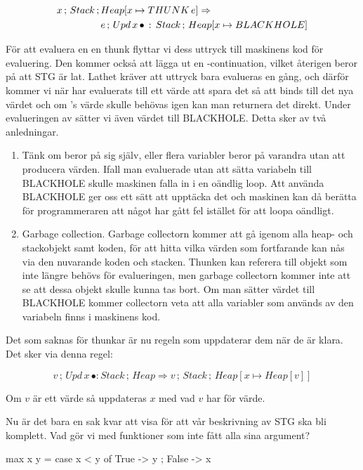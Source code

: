 \documentclass[../Core]{subfiles}
\begin{document}
\begin{align*}
x\,;\, Stack\,;\, & Heap[x\mapsto THUNK\,e] \Rightarrow  \\
 & e\,;\, Upd\, x\,\bullet\,:\, Stack\,;\, Heap[x\mapsto BLACKHOLE]
\end{align*}

För att evaluera en en thunk flyttar vi dess uttryck till maskinens kod
för evaluering. Den kommer också att lägga ut en -continuation, vilket
återigen beror på att STG är lat. Lathet kräver att uttryck bara evalueras
en gång, och därför kommer vi när  har evaluerats till ett värde att spara
det så att  binds till det nya värdet och om 's värde skulle behövas
igen kan man returnera det direkt. Under evalueringen av  sätter
vi även värdet  till BLACKHOLE. Detta sker av två anledningar.
\begin{enumerate}
\item Tänk om  beror på sig själv, eller flera variabler beror på varandra utan
att producera värden. Ifall man evaluerade utan att sätta variabeln till BLACKHOLE
skulle maskinen falla in i en oändlig loop. Att använda BLACKHOLE ger oss ett sätt att
upptäcka det och maskinen kan då berätta för programmeraren att något har gått fel
istället för att loopa oändligt.
\item Garbage collection. Garbage collectorn kommer att gå igenom alla heap- och stackobjekt
samt koden, för att hitta vilka värden som fortfarande kan nås via den nuvarande
koden och stacken. Thunken kan referera till objekt som inte längre
behövs för evalueringen, men garbage collectorn kommer inte att se att dessa objekt skulle
kunna tas bort. Om man sätter värdet till BLACKHOLE
kommer collectorn veta att alla variabler som används av den variabeln finns
i maskinens kod.
\end{enumerate}
Det som saknas för thunkar är nu regeln som uppdaterar dem när de
är klara. Det sker via denna regel:

\[
v\,;\, Upd\, x\,\bullet:Stack\,;\, Heap\Rightarrow v\,;\, Stack\,;\, Heap[x\mapsto Heap[v]]\]

Om $v$ är ett värde så uppdateras $x$ med vad $v$ har för värde.

Nu är det bara en sak kvar att visa för att vår beskrivning av STG ska bli komplett.
Vad gör vi med funktioner som inte fått alla sina argument?

\begin{codeEx}
max x y = case x < y of
    { True  -> y
    ; False -> x
    }
\end{codeEx}
\end{document}
